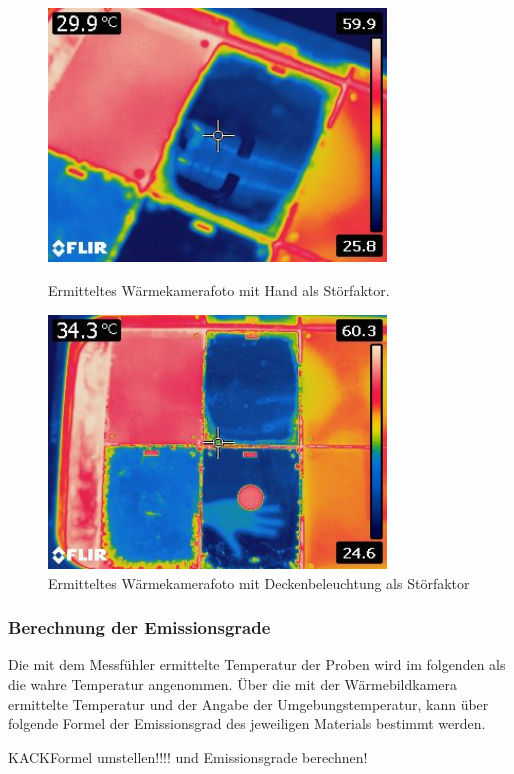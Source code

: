 \begin{figure}[H]
	\begin{minipage}{0.5\textwidth}
		\centering
		\includegraphics[width=0.8\textwidth]{../FLIR_100/FLIR2249.jpg}
		\caption[Ermitteltes Wärmekamerafoto mit Hand als Störfaktor]{Ermitteltes Wärmekamerafoto mit Hand als Störfaktor.}
		\label{fig:WBKHand}
	\end{minipage}\hfill
	\begin{minipage}{0.5\textwidth}
		\centering
		\includegraphics[width=0.8\textwidth]{../FLIR_100/FLIR2243.jpg}
		\caption[Ermitteltes Wärmekamerafoto mit Deckenbeleuchtung als Störfaktor]{Ermitteltes Wärmekamerafoto mit Deckenbeleuchtung als Störfaktor}
		\label{fig:WBKDecke}
	\end{minipage}
\end{figure}

\subsubsection{Berechnung der Emissionsgrade}

Die mit dem Messfühler ermittelte Temperatur der Proben wird im folgenden als die wahre Temperatur angenommen. Über die mit der Wärmebildkamera ermittelte Temperatur und der Angabe der Umgebungstemperatur, kann über folgende Formel der Emissionsgrad des jeweiligen Materials bestimmt werden. 

KACKFormel umstellen!!!!
und Emissionsgrade berechnen! 